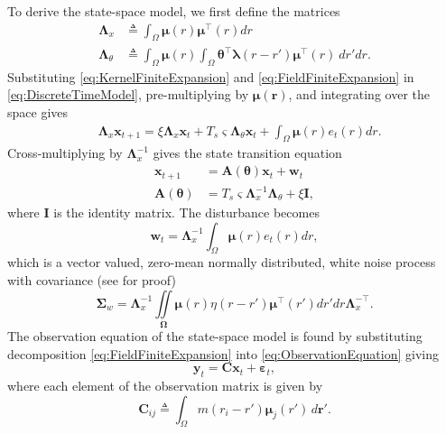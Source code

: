 \documentclass[journal]{IEEEtran}
\begin{document}
To derive the state-space model, we first define the matrices 
\begin{align}\label{eq:Lambdax}
 \mathbf{\Lambda}_{x} &\triangleq \int_{\Omega}\boldsymbol\mu\left(r\right)\boldsymbol\mu^\top\left(r\right) dr \\
\label{eq:Lambdatheta}
 \mathbf{\Lambda}_{\theta} &\triangleq \int_{\Omega}\boldsymbol\mu\left(r\right) \int_\Omega { 
	   \boldsymbol\theta^\top\boldsymbol\lambda\left(r-r'\right)
	    \boldsymbol\mu^\top\left(r\right)\ dr'dr.}
\end{align}
Substituting \eqref{eq:KernelFiniteExpansion} and \eqref{eq:FieldFiniteExpansion} in \eqref{eq:DiscreteTimeModel}, pre-multiplying by $\boldsymbol\mu\left(\mathbf r\right)$, and integrating over the space gives
\begin{align}\label{eq:DecomposedModel2} 
	&\mathbf{\Lambda}_{x} \mathbf{x}_{t+1}= 
	\xi\mathbf{\Lambda}_{x} \mathbf{x}_t +T_s \varsigma \mathbf{\Lambda}_{\theta}\mathbf{x}_t +\int_{\Omega}\boldsymbol\mu\left(r\right)e_t\left(r\right)dr.
\end{align}
Cross-multiplying by $\mathbf{\Lambda}_{x}^{-1}$ gives the state transition equation
\begin{align}\label{eq:StateEquation}
 \mathbf x_{t+1} &=\mathbf A(\boldsymbol \theta) \mathbf x_t+ \mathbf w_t\\
\label{eq:A_theta}
 \mathbf A(\boldsymbol \theta) &= T_s\varsigma\mathbf{\Lambda}_{x}^{-1}\mathbf{\Lambda}_{\theta}+\xi\mathbf I,
\end{align}
where $\mathbf I$ is the identity matrix. The disturbance becomes 
\begin{equation}\label{eq:Disturbance}
\mathbf w_t= \mathbf{\Lambda}_{x}^{-1}\int_{\Omega}\boldsymbol\mu \left(r\right)e_t\left(r\right)dr,
\end{equation}
which is a vector valued, zero-mean normally distributed, white noise process with covariance (see \cite{Freestone2011} for proof)
\begin{equation}
\boldsymbol\Sigma_w =\mathbf{\Lambda}_{x}^{-1}\iint\limits_{\boldsymbol\Omega}\boldsymbol\mu\left(r\right) \eta\left(r-r'\right)\boldsymbol\mu^{\top}\left(r'\right)dr'dr\mathbf{\Lambda}_{x}^{-\top}.
\end{equation}
The observation equation of the state-space model is found by substituting decomposition \eqref{eq:FieldFiniteExpansion}
 into \eqref{eq:ObservationEquation} giving
\begin{equation}\label{eq:ReducedObservationEquation} 
	\mathbf{y}_t = \mathbf{C}\mathbf{x}_t + \boldsymbol{\varepsilon}_t,
\end{equation}
where each element of the observation matrix is given by
\begin{equation}\label{eq:Observationmatrix}
	\mathbf{C}_{ij} \triangleq \int_{\Omega}m(r_i - r')\boldsymbol{\mu}_j(r') \, d\mathbf{r}'.
\end{equation}
\end{document}
